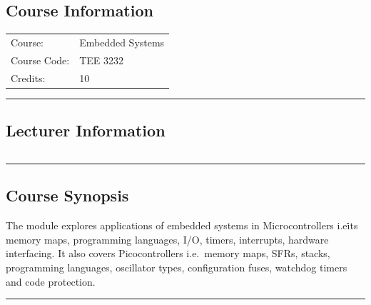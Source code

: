 
\subsection*{Course Information}\label{course:3232}
\vspace{0ex}%
\noindent\parbox{0.5\textwidth}{%
    \noindent\begin{tabular}{@{}ll}
                 \textsf{Course:}          & 	Embedded Systems  \\
                 \textsf{Course Code:}         & 	TEE 3232    \\
                 \textsf{Credits:}    & 	10
    \end{tabular}}
\vspace{2ex}\hrule\vspace{2ex}

\subsection*{Lecturer Information}
\noindent\parbox{0.5\textwidth}{%
    \noindent\begin{tabular}{@{}ll}
                 
    \end{tabular}}
\vspace{2ex}\hrule\vspace{2ex}


\subsection*{Course Synopsis}
The module explores applications of embedded systems in Microcontrollers i.e\. its memory maps, programming languages, I/O, timers, interrupts, hardware interfacing.
It also covers Picocontrollers i.e.\ memory maps, SFRs, stacks, programming languages, oscillator types, configuration fuses, watchdog timers and code protection.
\vspace{2ex}\hrule\vspace{2ex}

